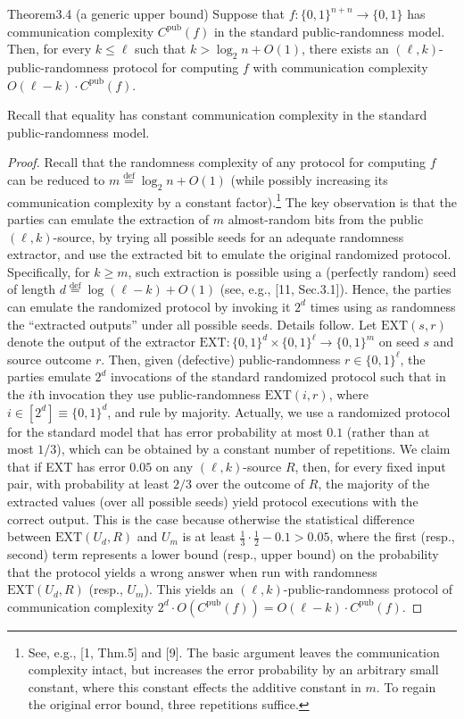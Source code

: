 \begin{authorclaim}{Theorem3.4 (a generic upper bound)}
Suppose that $f:\{0,1\}^{n+n}\to\{0,1\}$ has communication complexity $C^{\mathrm{pub}}(f)$ in the standard public-randomness model. Then, for every $k\le\ell$ such that $k>\log_2n+O(1)$, there exists an $(\ell,k)$-public-randomness protocol for computing $f$ with communication complexity $O(\ell-k)\cdot C^{\mathrm{pub}}(f)$.
\end{authorclaim}
Recall that equality has constant communication complexity in the standard public-randomness model.
\begin{proof}
Recall that the randomness complexity of any protocol for computing $f$ can be reduced to $m\stackrel{\mathrm{def}}=\log_2n+O(1)$ (while possibly increasing its communication complexity by a constant factor).\footnote{See, e.g., [1, Thm.5] and [9]. The basic argument leaves the communication complexity intact, but increases the error probability by an arbitrary small constant, where this constant effects the additive constant in $m$. To regain the original error bound, three repetitions suffice.} The key observation is that the parties can emulate the extraction of $m$ almost-random bits from the public $(\ell,k)$-source, by trying all possible seeds for an adequate randomness extractor, and use the extracted bit to emulate the original randomized protocol. Specifically, for $k\ge m$, such extraction is possible using a (perfectly random) seed of length $d\stackrel{\mathrm{def}}=\log(\ell-k)+O(1)$ (see, e.g., [11, Sec.3.1]). Hence, the parties can emulate the randomized protocol by invoking it $2^d$ times using as randomness the ``extracted outputs'' under all possible seeds. Details follow.
Let $\mathrm{EXT}(s,r)$ denote the output of the extractor $\mathrm{EXT}:\{0,1\}^d\times\{0,1\}^\ell\to\{0,1\}^m$ on seed $s$ and source outcome $r$. Then, given (defective) public-randomness $r\in\{0,1\}^\ell$, the parties emulate $2^d$ invocations of the standard randomized protocol such that in the $i$th invocation they use public-randomness $\mathrm{EXT}(i,r)$, where $i\in[2^d]\equiv\{0,1\}^d$, and rule by majority. Actually, we use a randomized protocol for the standard model that has error probability at most $0.1$ (rather than at most $1/3$), which can be obtained by a constant number of repetitions.
We claim that if EXT has error $0.05$ on any $(\ell,k)$-source $R$, then, for every fixed input pair, with probability at least $2/3$ over the outcome of $R$, the majority of the extracted values (over all possible seeds) yield protocol executions with the correct output. This is the case because otherwise the statistical difference between $\mathrm{EXT}(U_d,R)$ and $U_m$ is at least $\frac13\cdot\frac12-0.1>0.05$, where the first (resp., second) term represents a lower bound (resp., upper bound) on the probability that the protocol yields a wrong answer when run with randomness $\mathrm{EXT}(U_d,R)$ (resp., $U_m$). This yields an $(\ell,k)$-public-randomness protocol of communication complexity $2^d\cdot O(C^{\mathrm{pub}}(f))=O(\ell-k)\cdot C^{\mathrm{pub}}(f)$.
\end{proof}
